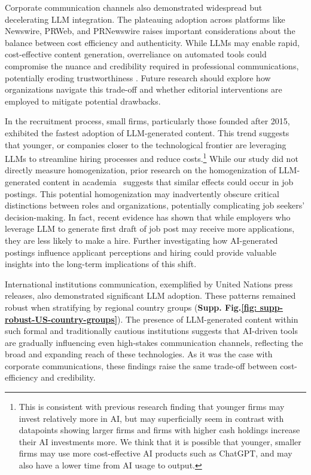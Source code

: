 Corporate communication channels also demonstrated widespread but decelerating LLM integration. The plateauing adoption across platforms like Newswire, PRWeb, and PRNewswire raises important considerations about the balance between cost efficiency and authenticity. While LLMs may enable rapid, cost-effective content generation, overreliance on automated tools could compromise the nuance and credibility required in professional communications, potentially eroding trustworthiness \cite{jakesch2019ai, hong2018bias, kadoma2024generative}. Future research should explore how organizations navigate this trade-off and whether editorial interventions are employed to mitigate potential drawbacks.



In the recruitment process, small firms, particularly those founded after 2015, exhibited the fastest adoption of LLM-generated content. This trend suggests that younger, or companies closer to the technological frontier are leveraging LLMs to streamline hiring processes and reduce costs.\footnote{This is consistent with previous research finding that younger firms may invest relatively more in AI, but may superficially seem in contrast with datapoints showing larger firms and firms with higher cash holdings increase their AI investments more.\cite{babina2024} We think that it is possible that younger, smaller firms may use more cost-effective AI products such as ChatGPT, and may also have a lower time from AI usage to output.} While our study did not directly measure homogenization, prior research on the homogenization of LLM-generated content in academia~\cite{liang2024monitoring,liang2024mapping} suggests that similar effects could occur in job postings. This potential homogenization may inadvertently obscure critical distinctions between roles and organizations, potentially complicating job seekers' decision-making. In fact, recent evidence has shown that while employers who leverage LLM to generate first draft of job post may receive more applications, they are less likely to make a hire\cite{wiles2023impact}. Further investigating how AI-generated postings influence applicant perceptions and hiring could provide valuable insights into the long-term implications of this shift. 


International institutions communication, exemplified by United Nations press releases, also demonstrated significant LLM adoption. These patterns remained robust when stratifying by regional country groups (\textbf{Supp. Fig.\ref{fig: supp-robust-US-country-groups}}). 
The presence of LLM-generated content within such formal and traditionally cautious institutions suggests that AI-driven tools are gradually influencing even high-stakes communication channels, reflecting the broad and expanding reach of these technologies. As it was the case with corporate communications, these findings raise the same trade-off between cost-efficiency and credibility.



